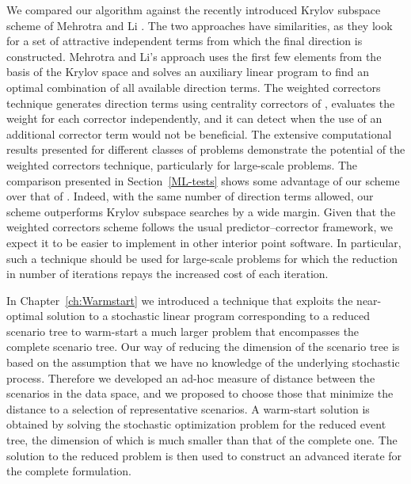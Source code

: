 We compared our algorithm against the recently introduced 
Krylov subspace scheme of Mehrotra and Li \cite{MehrotraLi}.
The two approaches have similarities, as they look for a set of attractive 
independent terms from which the final direction is constructed. 
Mehrotra and Li's approach uses the first few elements from the basis
of the Krylov space and solves an auxiliary linear program to find an
optimal combination of all available direction terms.
The weighted correctors technique generates direction terms using 
centrality correctors of \cite{Gondzio96}, evaluates the weight
for each corrector independently, and it can detect when the use
of an additional corrector term would not be beneficial.
The extensive computational results presented for different 
classes of problems demonstrate the potential of the
weighted correctors technique, particularly for large-scale problems.
The comparison presented in Section~\ref{ML-tests} 
shows some advantage
of our scheme over that of \cite{MehrotraLi}. Indeed, with the same 
number of direction terms allowed, our scheme outperforms Krylov subspace 
searches by a wide margin.
Given that the weighted correctors scheme follows the usual 
predictor--corrector framework,
we expect it to be easier to implement in other interior point software.
In particular, such a technique should be used for large-scale problems
for which the reduction in number of iterations repays the
increased cost of each iteration. 

In Chapter~\ref{ch:Warmstart}
we introduced a technique that exploits the near-optimal solution
to a stochastic linear program corresponding to a 
reduced scenario tree to warm-start a much larger problem 
that encompasses the complete scenario tree.
Our way of reducing the dimension of the scenario tree 
is based on the assumption that we have no knowledge 
of the underlying stochastic process. 
Therefore we developed an ad-hoc measure of distance 
between the scenarios in the data space, and we proposed to choose
those that minimize the distance to 
a selection of representative scenarios. 
A warm-start solution is obtained by solving the 
stochastic optimization problem for the reduced event tree, the dimension 
of which is much smaller than that of the complete one. The solution 
to the reduced problem is then used to construct an advanced iterate for 
the complete formulation. 

